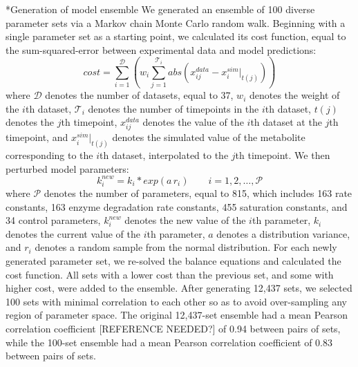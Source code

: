 \documentclass[12pt]{article}
\makeatletter
\renewcommand\subsection{\@startsection
	{subsection}{2}{0mm}
	{-0.05in}
	{-0.5\baselineskip}
	{\normalfont\normalsize\bfseries}}
\makeatother
\begin{document}
\subsection*{Generation of model ensemble}
We generated an ensemble of 100 diverse parameter sets via a Markov chain Monte Carlo random walk.
Beginning with a single parameter set as a starting point, we calculated its cost function, equal to the sum-squared-error between experimental data and model predictions:
\begin{equation}\label{eqn:cost-function}
    cost=\sum_{i=1}^{\mathcal{D}}\left(w_i\sum_{j=1}^{\mathcal{T}_i}abs\left(x_{ij}^{data}-x_{i}^{sim}|_{t(j)}\right)\right)
\end{equation}
where $\mathcal{D}$ denotes the number of datasets, equal to 37, $w_i$ denotes the weight of the $i$th dataset, $\mathcal{T}_i$ denotes the number of timepoints in the $i$th dataset, $t(j)$ denotes the $j$th timepoint, $x_{ij}^{data}$ denotes the value of the $i$th dataset at the $j$th timepoint, and $x_{i}^{sim}|_{t(j)}$ denotes the simulated value of the metabolite corresponding to the $i$th dataset, interpolated to the $j$th timepoint.
We then perturbed model parameters:
\begin{equation}\label{eqn:parameter-perturbation}
    k_i^{new}=k_i*exp(a\,r_i)\qquad{i=1,2,\hdots,\mathcal{P}}
\end{equation}
where $\mathcal{P}$ denotes the number of parameters, equal to 815, which includes 163 rate constants, 163 enzyme degradation rate constants, 455 saturation constants, and 34 control parameters, $k_i^{new}$ denotes the new value of the $i$th parameter, $k_i$ denotes the current value of the $i$th parameter, $a$ denotes a distribution variance, and $r_i$ denotes a random sample from the normal distribution.
For each newly generated parameter set, we re-solved the balance equations and calculated the cost function.
All sets with a lower cost than the previous set, and some with higher cost, were added to the ensemble.
After generating 12,437 sets, we selected 100 sets with minimal correlation to each other so as to avoid over-sampling any region of parameter space.
The original 12,437-set ensemble had a mean Pearson correlation coefficient [REFERENCE NEEDED?] of 0.94 between pairs of sets, while the 100-set ensemble had a mean Pearson correlation coefficient of 0.83 between pairs of sets.
\end{document}
